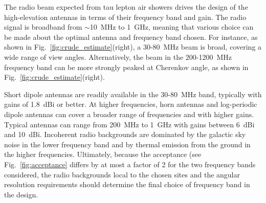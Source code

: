 \documentclass[12pt]{article}
\begin{document}
The radio beam expected from tau lepton air showers drives the design of the high-elevation antennas in terms of their frequency band and gain. The radio signal is broadband from $\sim$10~MHz to 1~GHz, meaning that various choice can be made about the optimal antenna and frequency band chosen. For instance, as shown in Fig.~\ref{fig:crude_estimate}(right), a 30-80~MHz beam is broad, covering a wide range of view angles. Alternatively, the beam in the 200-1200~MHz frequency band can be more strongly peaked at Cherenkov angle, as shown in Fig.~\ref{fig:crude_estimate}(right). 

Short dipole antennas are readily available in the 30-80~MHz band, typically with gains of 1.8~dBi or better. At higher frequencies, horn antennas and log-periodic dipole antennas can cover a broader range of frequencies and with higher gains. Typical antennas can range from 200~MHz to 1~GHz with gains between 6~dBi and 10~dBi. Incoherent radio backgrounds are dominated by the galactic sky noise in the lower frequency band and by thermal emission from the ground in the higher frequencies. Ultimately, because the acceptance (see Fig.~\ref{fig:acceptance} differs by at most a factor of 2 for the two frequency bands considered, the radio backgrounds local to the chosen sites and the angular resolution requirements should determine the final choice of frequency band in the design.
\end{document}

